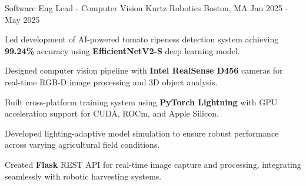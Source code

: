 \vspace{-1.0mm}
\vspace{-2.0mm}

\begin{cventries}
\setlength{\extrarowheight}{2mm}

\cventry
    {Software Eng Lead - Computer Vision} %
    {Kurtz Robotics} %
    {Boston, MA} %
    {Jan 2025 - May 2025} %
    {
    \begin{cvitems}
      \item {Led development of AI-powered tomato ripeness detection system achieving \textbf{99.24\%} accuracy using \textbf{EfficientNetV2-S} deep learning model.}
      \item {Designed computer vision pipeline with \textbf{Intel RealSense D456} cameras for real-time RGB-D image processing and 3D object analysis.}
      \item {Built cross-platform training system using \textbf{PyTorch Lightning} with GPU acceleration support for CUDA, ROCm, and Apple Silicon.}
      \item {Developed lighting-adaptive model simulation to ensure robust performance across varying agricultural field conditions.}
      \item {Created \textbf{Flask} REST API for real-time image capture and processing, integrating seamlessly with robotic harvesting systems.}
    \end{cvitems}
    }


\end{cventries}
